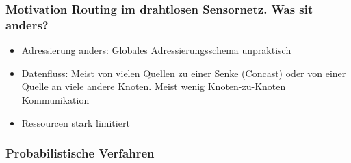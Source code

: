 \subsubsection{Motivation Routing im drahtlosen Sensornetz. Was sit anders?}
\begin{itemize}
	\item Adressierung anders: Globales Adressierungsschema unpraktisch
	\item Datenfluss: Meist von vielen Quellen zu einer Senke (Concast) oder von einer Quelle an viele andere Knoten. Meist wenig Knoten-zu-Knoten Kommunikation
	\item Ressourcen stark limitiert
\end{itemize}

\subsubsection{Probabilistische Verfahren}
